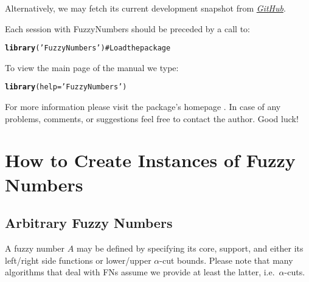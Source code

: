 \documentclass[11pt]{article}\usepackage{graphicx, color}
\makeatletter
\newcommand{\hlfunctioncall}[1]{\textcolor[rgb]{0.501960784313725,0,0.329411764705882}{\textbf{#1}}}%
\newcommand{\hlstring}[1]{\textcolor[rgb]{0.6,0.6,1}{#1}}%
\newcommand{\hlcomment}[1]{\textcolor[rgb]{0.180392156862745,0.6,0.341176470588235}{#1}}%
\newenvironment{kframe}{%
 \def\at@end@of@kframe{}%
 \ifinner\ifhmode%
  \def\at@end@of@kframe{\end{minipage}}%
  \begin{minipage}{\columnwidth}%
 \fi\fi%
 \def\FrameCommand##1{\hskip\@totalleftmargin \hskip-\fboxsep
 \colorbox{shadecolor}{##1}\hskip-\fboxsep
     \hskip-\linewidth \hskip-\@totalleftmargin \hskip\columnwidth}%
 \MakeFramed {\advance\hsize-\width
   \@totalleftmargin\z@ \linewidth\hsize
   \@setminipage}}%
 {\par\unskip\endMakeFramed%
 \at@end@of@kframe}
\newenvironment{knitrout}{}{} %
\newcommand{\package}[1]{\textsf{#1}\xspace}
\makeatother
\begin{document}
\noindent
Alternatively, we may fetch its current development snapshot
from \href{https://github.com/Rexamine/FuzzyNumbers}{\textit{GitHub}}.


\bigskip
Each session with \package{FuzzyNumbers} should be preceded by
a call to:

\begin{knitrout}\small
{}\color{fgcolor}\begin{kframe}
\begin{alltt}
\hlfunctioncall{library}(\hlstring{'FuzzyNumbers'}) \hlcomment{# Load the package}
\end{alltt}
\end{kframe}
\end{knitrout}


\bigskip
To view the main page of the manual we type:

\begin{knitrout}\small
{}\color{fgcolor}\begin{kframe}
\begin{alltt}
\hlfunctioncall{library}(help=\hlstring{'FuzzyNumbers'})
\end{alltt}
\end{kframe}
\end{knitrout}


\noindent
For more information please visit the package's homepage \cite{Gagolewski:FuzzyNumbersHome}.
In case of any problems, comments, or suggestions feel free to contact the author.
Good luck!








\section{How to Create Instances of Fuzzy Numbers}


\subsection{Arbitrary Fuzzy Numbers}

A fuzzy number $A$ may be defined by specifying
its core, support, and either its left/right side functions
or lower/upper $\alpha$-cut bounds. Please note that many algorithms that
deal with FNs assume we provide at least the latter, i.e.~$\alpha$-cuts.
\end{document}
